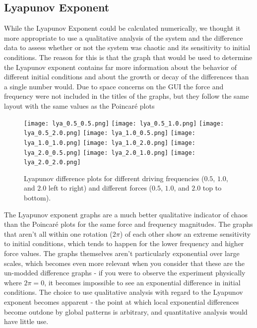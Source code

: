 \documentclass[11pt]{article} %
\begin{document}
    \subsection{Lyapunov Exponent}
    While the Lyapunov Exponent could be calculated numerically, we thought it more appropriate to use a qualitative analysis of the system and
    the difference data to assess whether or not the system was chaotic and its sensitivity to initial conditions. The reason for this is that
    the graph that would be used to determine the Lyapunov exponent contains far more information about the behavior of different initial conditions
    and about the growth or decay of the differences than a single number would. Due to space concerns on the GUI the force and frequency were not
    included in the titles of the graphs, but they follow the same layout with the same values as the Poincar\'e plots
    \begin{figure}[H]
        \centering
        \texttt{[image: lya\_0.5\_0.5.png]}
        \texttt{[image: lya\_0.5\_1.0.png]}
        \texttt{[image: lya\_0.5\_2.0.png]}
        \texttt{[image: lya\_1.0\_0.5.png]}
        \texttt{[image: lya\_1.0\_1.0.png]}
        \texttt{[image: lya\_1.0\_2.0.png]}
        \texttt{[image: lya\_2.0\_0.5.png]}
        \texttt{[image: lya\_2.0\_1.0.png]}
        \texttt{[image: lya\_2.0\_2.0.png]}
        \caption{Lyapunov difference plots for different driving frequencies ($0.5$, $1.0$, and $2.0$ left to right) and different
        forces ($0.5$, $1.0$, and $2.0$ top to bottom).}
    \end{figure}
    The Lyapunov exponent graphs are a much better qualitative indicator of chaos than the Poincar\'e plots for the same force and frequency
    magnitudes. The graphs that aren't all within one rotation ($2\pi$) of each other show an extreme sensitivity to initial conditions, which
    tends to happen for the lower frequency and higher force values. The graphs themselves aren't particularly exponential over large scales, which
    becomes even more relevant when you consider that these are the un-modded difference graphs - if you were to observe the experiment physically
    where $2\pi = 0$, it becomes impossible to see an exponential difference in initial conditions. The choice to use qualitative analysis with regard
    to the Lyapunov exponent becomes apparent - the point at which local exponential differences become outdone by global patterns is arbitrary, and
    quantitative analysis would have little use.\\
\end{document}
